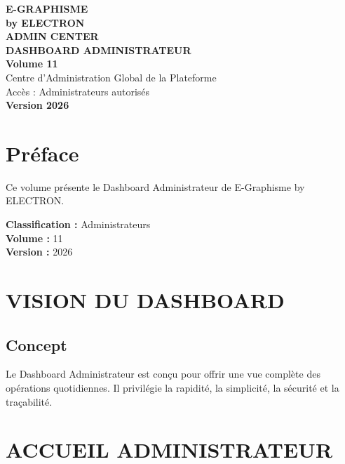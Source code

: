 \documentclass[12pt,a4paper,oneside]{book}
\begin{document}
\begin{titlepage}
\thispagestyle{empty}
\begin{center}
\vspace*{2cm}
{\Huge\bfseries\color{bleuIA}E-GRAPHISME}\\[0.3cm]
{\LARGE\bfseries\color{violet}by ELECTRON}\\[2cm]
\vspace{2cm}
{\huge\bfseries\color{noir}ADMIN CENTER}\\[0.3cm]
{\huge\bfseries\color{noir}DASHBOARD ADMINISTRATEUR}\\[1cm]
{\Large\bfseries\color{cyan}Volume 11}\\[3cm]
\vspace{2cm}
{\Large\color{gris}Centre d'Administration Global de la Plateforme}\\[0.5cm]
{\Large\color{gris}Accès : Administrateurs autorisés}\\[3cm]
{\Large\bfseries\color{or}Version 2026}\\[2cm]
\vfill
\end{center}
\end{titlepage}

\frontmatter

\chapter*{Préface}
Ce volume présente le Dashboard Administrateur de E-Graphisme by ELECTRON.

\bigskip
\textbf{Classification :} Administrateurs\\
\textbf{Volume :} 11\\
\textbf{Version :} 2026

\tableofcontents

\mainmatter

\chapter{VISION DU DASHBOARD}

\section{Concept}
Le Dashboard Administrateur est conçu pour offrir une vue complète des opérations quotidiennes. Il privilégie la rapidité, la simplicité, la sécurité et la traçabilité.

\chapter{ACCUEIL ADMINISTRATEUR}
\end{document}
